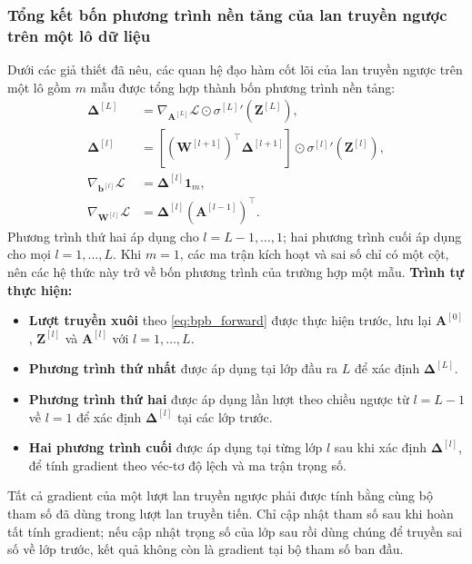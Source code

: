 \subsubsection{Tổng kết bốn phương trình nền tảng của lan truyền ngược trên một lô dữ liệu}
Dưới các giả thiết đã nêu, các quan hệ đạo hàm cốt lõi của lan truyền ngược trên một lô gồm $m$ mẫu được tổng hợp thành bốn phương trình nền tảng:
\begin{subequations}
\label{eq:bpb_four_fundamental}
\begin{align}
    \boldsymbol{\Delta}^{[L]} &= \nabla_{\mathbf{A}^{[L]}}\mathcal{L} \odot {\sigma^{[L]}}'\!\left(\mathbf{Z}^{[L]}\right), \label{eq:bpb_output_error} \\[6pt]
    \boldsymbol{\Delta}^{[l]} &= \left[ \left(\mathbf{W}^{[l+1]}\right)^{\top}\boldsymbol{\Delta}^{[l+1]} \right] \odot {\sigma^{[l]}}'\!\left(\mathbf{Z}^{[l]}\right), \label{eq:bpb_hidden_error} \\[6pt]
    \nabla_{\mathbf{b}^{[l]}}\mathcal{L} &= \boldsymbol{\Delta}^{[l]}\mathbf{1}_m, \label{eq:bpb_bias_grad} \\[6pt]
    \nabla_{\mathbf{W}^{[l]}}\mathcal{L} &= \boldsymbol{\Delta}^{[l]}\left(\mathbf{A}^{[l-1]}\right)^{\top}. \label{eq:bpb_weight_grad}
\end{align}
\end{subequations}
Phương trình thứ hai áp dụng cho $l=L-1,\dots,1$; hai phương trình cuối áp dụng cho mọi $l=1,\dots,L$. Khi $m=1$, các ma trận kích hoạt và sai số chỉ có một cột, nên các hệ thức này trở về bốn phương trình của trường hợp một mẫu.
\textbf{Trình tự thực hiện:}
\begin{itemize}
    \item \textbf{Lượt truyền xuôi} theo \eqref{eq:bpb_forward} được thực hiện trước, lưu lại $\mathbf{A}^{[0]}$, $\mathbf{Z}^{[l]}$ và $\mathbf{A}^{[l]}$ với $l = 1,\dots,L$.
    \item \textbf{Phương trình thứ nhất} được áp dụng tại lớp đầu ra $L$ để xác định $\boldsymbol{\Delta}^{[L]}$.
    \item \textbf{Phương trình thứ hai} được áp dụng lần lượt theo chiều ngược từ $l = L-1$ về $l = 1$ để xác định $\boldsymbol{\Delta}^{[l]}$ tại các lớp trước.
    \item \textbf{Hai phương trình cuối} được áp dụng tại từng lớp $l$ sau khi xác định $\boldsymbol{\Delta}^{[l]}$, để tính gradient theo véc-tơ độ lệch và ma trận trọng số.
\end{itemize}
Tất cả gradient của một lượt lan truyền ngược phải được tính bằng cùng bộ tham số đã dùng trong lượt lan truyền tiến. Chỉ cập nhật tham số sau khi hoàn tất tính gradient; nếu cập nhật trọng số của lớp sau rồi dùng chúng để truyền sai số về lớp trước, kết quả không còn là gradient tại bộ tham số ban đầu.


